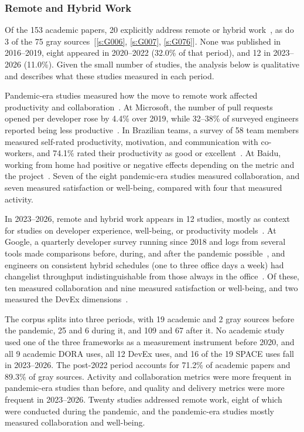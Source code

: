 \documentclass[preprint,number]{elsarticle}
\newcounter{study}
\newcommand{\refG}[1]{\ref{s:#1}}
\begin{document}
\subsubsection{Remote and Hybrid Work}

Of the 153 academic papers, 20 explicitly address remote or hybrid work~\cite{P0001, P0027, P0181, P0184, P0473, P0551, P0611, P1259, P1280, P1503, P2021, P2056, P2068, P2083, P2086, P2112, P2115, P2125, P2130, P2132}, as do 3 of the 75 gray sources~[\refG{G006}, \refG{G007}, \refG{G076}]. None was published in 2016--2019, eight appeared in 2020--2022 (32.0\% of that period), and 12 in 2023--2026 (11.0\%). Given the small number of studies, the analysis below is qualitative and describes what these studies measured in each period.

Pandemic-era studies measured how the move to remote work affected productivity and collaboration~\cite{P1503, P2130, P2132}. At Microsoft, the number of pull requests opened per developer rose by 4.4\% over 2019, while 32--38\% of surveyed engineers reported being less productive~\cite{P2132}. In Brazilian teams, a survey of 58 team members measured self-rated productivity, motivation, and communication with co-workers, and 74.1\% rated their productivity as good or excellent~\cite{P2130}. At Baidu, working from home had positive or negative effects depending on the metric and the project~\cite{P0611}. Seven of the eight pandemic-era studies measured collaboration, and seven measured satisfaction or well-being, compared with four that measured activity.

In 2023--2026, remote and hybrid work appears in 12 studies, mostly as context for studies on developer experience, well-being, or productivity models~\cite{P0473, P2056, P2021}. At Google, a quarterly developer survey running since 2018 and logs from several tools made comparisons before, during, and after the pandemic possible~\cite{P2112, P2125}, and engineers on consistent hybrid schedules (one to three office days a week) had changelist throughput indistinguishable from those always in the office~\cite{P2086}. Of these, ten measured collaboration and nine measured satisfaction or well-being, and two measured the DevEx dimensions~\cite{P0001, P1280}.

\begin{tcolorbox}[colback=gray!5, colframe=gray!50, title={\textbf{Summary of RQ2}}, fonttitle=\small]
\footnotesize
The corpus splits into three periods, with 19 academic and 2 gray sources before the pandemic, 25 and 6 during it, and 109 and 67 after it. No academic study used one of the three frameworks as a measurement instrument before 2020, and all 9 academic DORA uses, all 12 DevEx uses, and 16 of the 19 SPACE uses fall in 2023--2026. The post-2022 period accounts for 71.2\% of academic papers and 89.3\% of gray sources. Activity and collaboration metrics were more frequent in pandemic-era studies than before, and quality and delivery metrics were more frequent in 2023--2026. Twenty studies addressed remote work, eight of which were conducted during the pandemic, and the pandemic-era studies mostly measured collaboration and well-being.
\end{tcolorbox}
\end{document}
